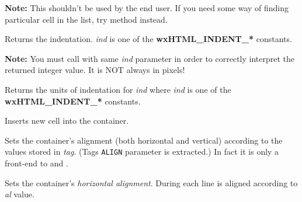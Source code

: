 {\bf Note:} This shouldn't be used by the end user. If you need some way of
finding particular cell in the list, try  method
instead.

\label{wxhtmlcontainercellgetindent}


Returns the indentation. {\it ind} is one of the {\bf wxHTML\_INDENT\_*} constants.

{\bf Note:} You must call  
with same {\it ind} parameter in order to correctly interpret the returned integer value.
It is NOT always in pixels!

\label{wxhtmlcontainercellgetindentunits}


Returns the units of indentation for {\it ind} where {\it ind} is one
of the {\bf wxHTML\_INDENT\_*} constants.

\label{wxhtmlcontainercellinsertcell}


Inserts new cell into the container.

\label{wxhtmlcontainercellsetalign}


Sets the container's alignment (both horizontal and vertical) according to
the values stored in {\it tag}. (Tags {\tt ALIGN} parameter is extracted.) In fact
it is only a front-end to  
and .

\label{wxhtmlcontainercellsetalignhor}


Sets the container's {\it horizontal alignment}. During  
each line is aligned according to {\it al} value.




